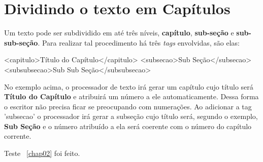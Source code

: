 \newpage \chapter{Dividindo o texto em Capítulos}\setcounter{SteP}{1}

Um texto pode ser subdividido em até três níveis, {\bf capítulo},
{\bf sub-seção} e {\bf sub-sub-seção}. Para realizar tal procedimento 
há três {\it tags} envolvidas, são elas:

\begin{BoxVerbatim}
<capitulo>Título do Capítulo</capitulo>
    <subsecao>Sub Seção</subsecao>
        <subsubsecao>Sub Sub Seção</subsubsecao>
\end{BoxVerbatim}

No exemplo acima, o processador de texto irá gerar um capítulo cujo título
será {\bf Título do Capítulo} e atribuirá um número a ele automaticamente.
Dessa forma o escritor não precisa ficar se preocupando com numerações. Ao
adicionar a tag 'subsecao' o processador irá gerar a subseção cujo
título será, segundo o exemplo, {\bf Sub Seção} e o número atribuído a ela
será coerente com o número do capítulo corrente.

Teste ~\ref{chap02} foi feito.